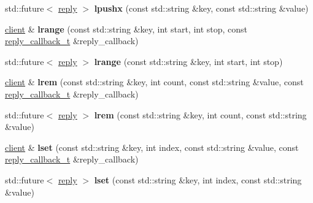 \begin{DoxyCompactItemize}
\item 
\mbox{\label{classcpp__redis_1_1client_af9a3e05f5bd6d4ebb3138dc09f8d0d4e}} 
std\+::future$<$ \hyperlink{classcpp__redis_1_1reply}{reply} $>$ {\bfseries lpushx} (const std\+::string \&key, const std\+::string \&value)
\item 
\mbox{\label{classcpp__redis_1_1client_a9e85cce8555274f7bc706a13911b4579}} 
\hyperlink{classcpp__redis_1_1client}{client} \& {\bfseries lrange} (const std\+::string \&key, int start, int stop, const \hyperlink{classcpp__redis_1_1client_a061a1140d36d2eaeda82b09a0bb3f9f2}{reply\+\_\+callback\+\_\+t} \&reply\+\_\+callback)
\item 
\mbox{\label{classcpp__redis_1_1client_a1e7c8d099459af438cc4ed215afef066}} 
std\+::future$<$ \hyperlink{classcpp__redis_1_1reply}{reply} $>$ {\bfseries lrange} (const std\+::string \&key, int start, int stop)
\item 
\mbox{\label{classcpp__redis_1_1client_a26d934d6fd06503d8727969be5ebb043}} 
\hyperlink{classcpp__redis_1_1client}{client} \& {\bfseries lrem} (const std\+::string \&key, int count, const std\+::string \&value, const \hyperlink{classcpp__redis_1_1client_a061a1140d36d2eaeda82b09a0bb3f9f2}{reply\+\_\+callback\+\_\+t} \&reply\+\_\+callback)
\item 
\mbox{\label{classcpp__redis_1_1client_a6581856beb86e871feb42d703cd1824a}} 
std\+::future$<$ \hyperlink{classcpp__redis_1_1reply}{reply} $>$ {\bfseries lrem} (const std\+::string \&key, int count, const std\+::string \&value)
\item 
\mbox{\label{classcpp__redis_1_1client_a98e469104f97332c785d4c2f3d15150e}} 
\hyperlink{classcpp__redis_1_1client}{client} \& {\bfseries lset} (const std\+::string \&key, int index, const std\+::string \&value, const \hyperlink{classcpp__redis_1_1client_a061a1140d36d2eaeda82b09a0bb3f9f2}{reply\+\_\+callback\+\_\+t} \&reply\+\_\+callback)
\item 
\mbox{\label{classcpp__redis_1_1client_a4c0d3955450ed6bda887688c863baa72}} 
std\+::future$<$ \hyperlink{classcpp__redis_1_1reply}{reply} $>$ {\bfseries lset} (const std\+::string \&key, int index, const std\+::string \&value)

\end{DoxyCompactItemize}
